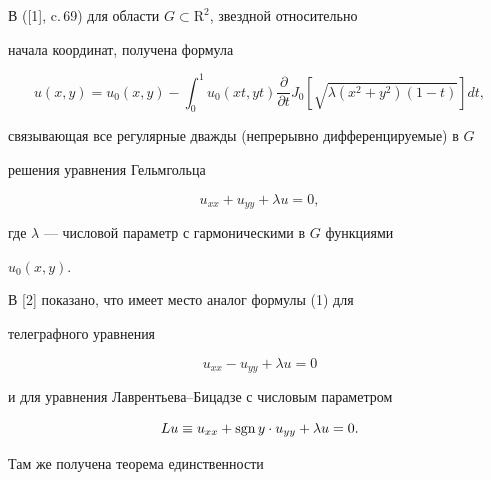 

\maketitle


\label{begin}








В ([1], c.\,69) для области $G\subset{\mathrm R}^2$, звездной относительно 


начала координат, получена формула


\begin{equation}


u(x,y)=u_0(x,y)-\int_0^1 u_0(xt,yt)\frac {\partial }


{\partial t}J_0[\sqrt {\lambda (x^2+y^2)(1-t)}]dt,


\end{equation}


связывающая все регулярные дважды (непрерывно дифференцируемые) в $G$


решения уравнения Гельмгольца


\begin{equation}


u_{xx}+u_{yy}+\lambda u=0,


\end{equation}


где $\lambda$ --- числовой параметр с гармоническими в $G$ функциями


$u_0(x,y)$.





В [2] показано, что имеет место аналог формулы (1) для


телеграфного уравнения


\begin{equation}


u_{xx}-u_{yy}+\lambda u=0


\end{equation}


и для уравнения Лаврентьева--Бицадзе с числовым параметром


\begin{equation}


Lu\equiv u_{xx}+\sgn y\cdot u_{yy}+\lambda u=0.


\end{equation}


Там же получена теорема единственности 


